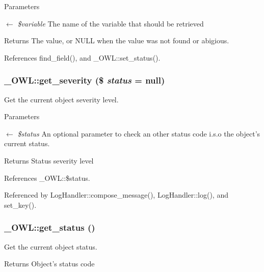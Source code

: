 \begin{DoxyParams}{Parameters}
\item[\mbox{$\leftarrow$} {\em \$variable}]The name of the variable that should be retrieved \end{DoxyParams}
\begin{DoxyReturn}{Returns}
The value, or NULL when the value was not found or abigious. 
\end{DoxyReturn}


References find\_\-field(), and \_\-OWL::set\_\-status().

\subsubsection[{get\_\-severity}]{\setlength{\rightskip}{0pt plus 5cm}\_\-OWL::get\_\-severity (\$ {\em status} = {\ttfamily null})}\label{class__OWL_adf9509ef96858be7bdd9414c5ef129aa}
Get the current object severity level.


\begin{DoxyParams}{Parameters}
\item[\mbox{$\leftarrow$} {\em \$status}]An optional parameter to check an other status code i.s.o the object's current status. \end{DoxyParams}
\begin{DoxyReturn}{Returns}
Status severity level 
\end{DoxyReturn}


References \_\-OWL::\$status.



Referenced by LogHandler::compose\_\-message(), LogHandler::log(), and set\_\-key().

\subsubsection[{get\_\-status}]{\setlength{\rightskip}{0pt plus 5cm}\_\-OWL::get\_\-status ()}\label{class__OWL_a99ec771fa2c5c279f80152cc09e489a8}
Get the current object status.

\begin{DoxyReturn}{Returns}
Object's status code 
\end{DoxyReturn}



